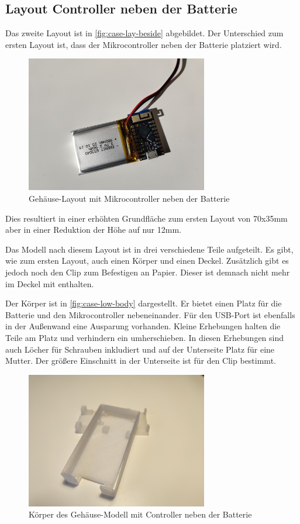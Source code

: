 \FloatBarrier

\subsection{Layout Controller neben der Batterie}
Das zweite Layout ist in \autoref{fig:case-lay-beside} abgebildet.
Der Unterschied zum ersten Layout ist, dass der Mikrocontroller neben der Batterie platziert wird.

\begin{figure}[htbp]
	\includegraphics[width=300px]{images/case/pico_beside_battery.jpg}
	\centering
	\caption{Gehäuse-Layout mit Mikrocontroller neben der Batterie}
	\label{fig:case-lay-beside}
\end{figure}

Dies resultiert in einer erhöhten Grundfläche zum ersten Layout von 70x35mm aber in einer Reduktion der Höhe auf nur 12mm.

Das Modell nach diesem Layout ist in drei verschiedene Teile aufgeteilt.
Es gibt, wie zum ersten Layout, auch einen Körper und einen Deckel.
Zusätzlich gibt es jedoch noch den Clip zum Befestigen an Papier.
Dieser ist demnach nicht mehr im Deckel mit enthalten.

Der Körper ist in \autoref{fig:case-low-body} dargestellt.
Er bietet einen Platz für die Batterie und den Mikrocontroller nebeneinander.
Für den \gls{USB}-Port ist ebenfalls in der Außenwand eine Ausparung vorhanden.
Kleine Erhebungen halten die Teile am Platz und verhindern ein umherschieben.
In diesen Erhebungen sind auch Löcher für Schrauben inkludiert und auf der Unterseite Platz für eine Mutter.
Der größere Einschnitt in der Unterseite ist für den Clip bestimmt.

\begin{figure}[htbp]
	\includegraphics[width=300px]{images/case/low_body.jpg}
	\centering
	\caption{Körper des Gehäuse-Modell mit Controller neben der Batterie}
	\label{fig:case-low-body}
\end{figure}

